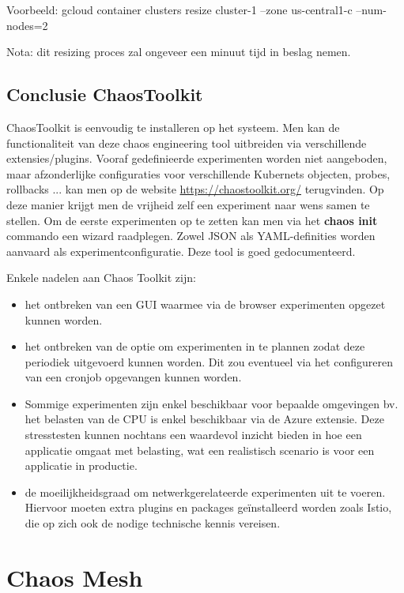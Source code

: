 Voorbeeld: gcloud container clusters resize cluster-1 --zone us-central1-c --num-nodes=2

Nota: dit resizing proces zal ongeveer een minuut tijd in beslag nemen. 

\subsection{Conclusie ChaosToolkit}

ChaosToolkit is eenvoudig te installeren op het systeem. Men kan de functionaliteit van deze chaos engineering tool uitbreiden via verschillende extensies/plugins. Vooraf gedefinieerde experimenten worden niet aangeboden, maar afzonderlijke configuraties voor verschillende Kubernets objecten, probes, rollbacks ... kan men op de website \url{https://chaostoolkit.org/} terugvinden. 
\newline Op deze manier krijgt men de vrijheid zelf een experiment naar wens samen te stellen. Om de eerste experimenten op te zetten kan men via het {\bf chaos init} commando een wizard raadplegen. Zowel JSON als YAML-definities worden aanvaard als experimentconfiguratie. Deze tool is goed gedocumenteerd. 

Enkele nadelen aan Chaos Toolkit zijn:
\begin{itemize}
    \item  het ontbreken van een GUI waarmee via de browser experimenten opgezet kunnen worden.
    \item  het ontbreken van de optie om experimenten in te plannen zodat deze periodiek uitgevoerd kunnen worden. Dit zou eventueel via het configureren van een cronjob opgevangen kunnen worden.
    \item Sommige experimenten zijn enkel beschikbaar voor bepaalde omgevingen bv. 
    het belasten van de CPU is enkel beschikbaar via de Azure extensie. Deze stresstesten kunnen nochtans een waardevol inzicht bieden in hoe een applicatie omgaat met belasting, wat een realistisch scenario is voor een applicatie in productie. 
    \item de moeilijkheidsgraad om netwerkgerelateerde experimenten uit te voeren. Hiervoor moeten extra plugins en packages geïnstalleerd worden zoals Istio, die op zich ook de nodige technische kennis vereisen.   
\end{itemize}

\section{Chaos Mesh}

